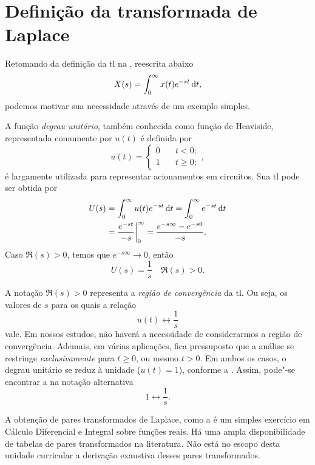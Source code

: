 \section{Definição da transformada de Laplace}

Retomando da definição da \ac{tl} na , reescrita abaixo
\begin{equation*}
	X(s)=\inte{x(t)e^{-st}}{t}{0}{\infty},
\end{equation*}
podemos motivar sua necessidade através de um exemplo simples.

A função \emph{degrau unitário}, também conhecida como função de Heaviside, representada comumente por $u(t)$ é definida por
\begin{equation}\label{eq:heaviside}
	\boxed{u(t)=\begin{cases}
		0\quad&t<0;\\
		1\quad&t\geq0;
	\end{cases}},
\end{equation}
é largamente utilizada para representar acionamentos em circuitos. Sua \ac{tl} pode ser obtida por
\begin{align*}
	U(s)&=\inte{u(t)e^{-st}}{t}{0}{\infty}=\inte{e^{-st}}{t}{0}{\infty}\\
		&=\frac{e^{-st}}{-s}\bigg|_{0}^{\infty}=\frac{e^{-s\infty}-e^{-s0}}{-s}.
\end{align*}
Caso $\Re(s)>0$, temos que $e^{-s\infty}\to0$, então
\begin{equation*}
	U(s)=\frac{1}{s}\quad\Re(s)>0.
\end{equation*}

A notação $\Re(s)>0$ representa a \emph{região de convergência} da \ac{tl}. Ou seja, os valores de $s$ para os quais a relação
\begin{equation}\label{eq:tlheaviside}
	\boxed{u(t)\longleftrightarrow\frac{1}{s}}
\end{equation}
vale. Em nossos estudos, não haverá a necessidade de considerarmos a região de convergência. Ademais, em várias aplicações, fica pressuposto que a análise se restringe \emph{exclusivamente} para $t\geq0$, ou mesmo $t>0$. Em ambos os casos, o degrau unitário se reduz à unidade ($u(t)=1$), conforme a . Assim, pode"-se encontrar a  na notação alternativa
\begin{equation}
	1\longleftrightarrow\frac{1}{s}.
\end{equation}

A obtenção de pares transformados de Laplace, como a  é um simples exercício em Cálculo Diferencial e Integral sobre funções reais. Há uma ampla disponibilidade de tabelas de pares transformados na literatura. Não está no escopo desta unidade curricular a derivação exaustiva desses pares transformados.

